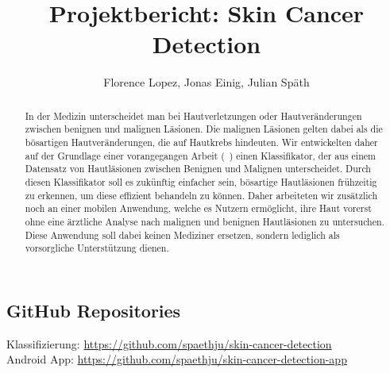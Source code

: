 \documentclass[a4paper, doc]{scrartcl}
\title{Projektbericht: Skin Cancer Detection}
\author{Florence Lopez, Jonas Einig, Julian Späth \\}
\begin{document}
\maketitle
\begin{abstract}
In der Medizin unterscheidet man bei Hautverletzungen oder Hautveränderungen zwischen benignen und malignen Läsionen. Die malignen Läsionen gelten dabei als die bösartigen Hautveränderungen, die auf Hautkrebs hindeuten. Wir entwickelten daher auf der Grundlage einer vorangegangen Arbeit (~\cite{esteva2017dermatologist}) einen Klassifikator, der aus einem Datensatz von Hautläsionen zwischen Benignen und Malignen unterscheidet. Durch diesen Klassifikator soll es zukünftig einfacher sein, bösartige Hautläsionen frühzeitig zu erkennen, um diese effizient behandeln zu können. Daher arbeiteten wir zusätzlich noch an einer mobilen Anwendung, welche es Nutzern ermöglicht, ihre Haut vorerst ohne eine ärztliche Analyse nach malignen und benignen Hautläsionen zu untersuchen. Diese Anwendung soll dabei keinen Mediziner ersetzen, sondern lediglich als vorsorgliche Unterstützung dienen. 
\end{abstract}
    
\subsection*{GitHub Repositories} 
Klassifizierung: \url{https://github.com/spaethju/skin-cancer-detection}\\
Android App: \url{https://github.com/spaethju/skin-cancer-detection-app}









\end{document}
